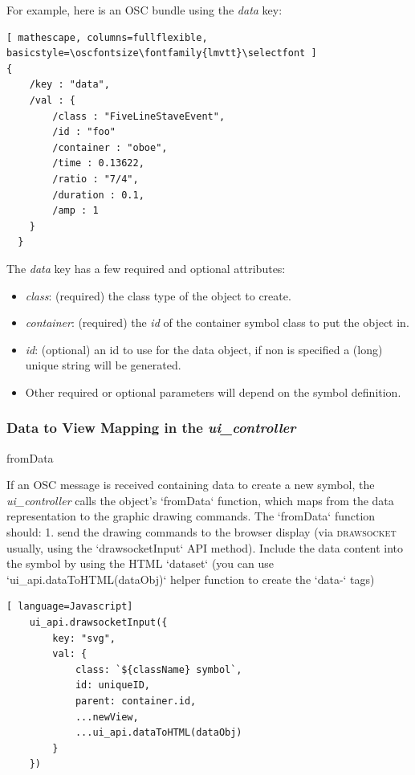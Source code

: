 \documentclass{article}
\def\drawsocket{\textsc{drawsocket}\xspace}
\def\uicontroller{\textit{ui\_controller}\xspace}
\def\oscfontsize{\footnotesize}
\begin{document}
For example, here is an OSC bundle using the \textit{data} key:

\begin{lstlisting}[ mathescape, columns=fullflexible, basicstyle=\oscfontsize\fontfamily{lmvtt}\selectfont ]
{
    /key : "data",
    /val : {
        /class : "FiveLineStaveEvent",
        /id : "foo"
        /container : "oboe",
        /time : 0.13622,
        /ratio : "7/4",
        /duration : 0.1,
        /amp : 1
    }
  }
\end{lstlisting}

The \textit{data} key has a few required and optional attributes:
\begin{itemize}\itemsep0pt 
  \item \textit{class}: (required) the class type of the object to create.
  \item \textit{container}: (required) the \textit{id} of the container symbol class to put the object in.
   \item \textit{id}: (optional) an id to use for the data object, if non is specified a (long) unique string will be generated.
  \item Other required or optional parameters will depend on the symbol definition.
\end{itemize}


\subsubsection{Data to View Mapping in the \uicontroller}

fromData

If an OSC message is received containing data to create a new symbol, the \uicontroller calls the object's `fromData` function, which maps from the data representation to the graphic drawing commands. The `fromData` function should:
1. send the drawing commands to the browser display (via \drawsocket usually, using the `drawsocketInput` API method). Include the data content into the symbol by using the HTML `dataset` (you can use `ui\_api.dataToHTML(dataObj)` helper function to create the `data-` tags)

\begin{lstlisting}[ language=Javascript]
    ui_api.drawsocketInput({
        key: "svg",
        val: {
            class: `${className} symbol`,
            id: uniqueID,
            parent: container.id,
            ...newView, 
            ...ui_api.dataToHTML(dataObj)
        }
    }) 
\end{lstlisting}
\end{document}
